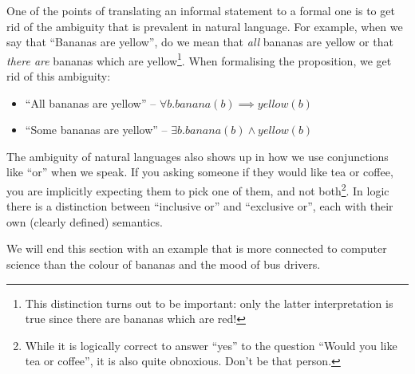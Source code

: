 \documentclass{tufte-handout}
\newcounter{example}
\begin{document}
One of the points of translating an informal statement to a formal
one is to get rid of the ambiguity that is prevalent in natural
language. For example, when we say that ``Bananas are yellow'', do
we mean that \emph{all} bananas are yellow or that \emph{there
  are} bananas which are yellow\footnote{This distinction turns
  out to be important: only the latter interpretation is true
  since there are bananas which are red!}. When formalising the
proposition, we get rid of this ambiguity:

\begin{itemize}
\item ``All bananas are yellow'' -- $\forall b. \mathit{banana}(b) \implies \mathit{yellow}(b)$
\item ``Some bananas are yellow'' -- $\exists b. \mathit{banana}(b) \land \mathit{yellow}(b)$
\end{itemize}

\noindent
The ambiguity of natural languages also shows up in how we use
conjunctions like ``or'' when we speak. If you asking someone if
they would like tea or coffee, you are implicitly expecting them
to pick one of them, and not both\footnote{While it is logically
  correct to answer ``yes'' to the question ``Would you like tea
  or coffee'', it is also quite obnoxious. Don't be that person.
}. In logic there is a distinction between ``inclusive or'' and
``exclusive or'', each with their own (clearly defined) semantics.

We will end this section with an example that is more connected to
computer science than the colour of bananas and the mood of bus
drivers.
\end{document}
